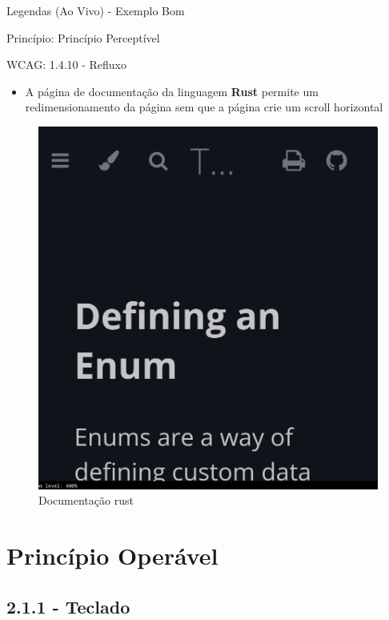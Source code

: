 \documentclass{beamer}
\begin{document}
\begin{frame}{Legendas (Ao Vivo) - Exemplo Bom}

Princípio: Princípio Perceptível

WCAG: 1.4.10 - Refluxo

\begin{itemize}
	\item A página de documentação da linguagem \textbf{Rust} permite um redimensionamento da página sem que a página crie um scroll horizontal
\end{itemize}
\begin{figure}
    \centering
    \includegraphics[scale=0.15]{images/refluxo.png}
    \caption{Documentação rust}
\end{figure}
\end{frame}

\section{Princípio Operável}
\subsection{2.1.1 - Teclado}
\end{document}
